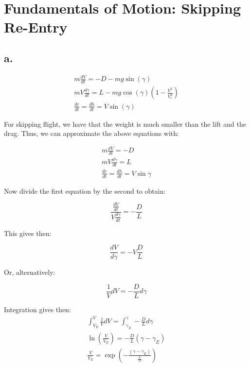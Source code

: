 \section{ Fundamentals of Motion: Skipping Re-Entry }\label{sec:q4}    
\subsection*{a.}
\begin{equation}
    \begin{split}
        m \frac{dV}{dt} = -D - mg\sin{(\gamma)} \\
        m V \frac{d \gamma}{dt} = L - mg \cos{(\gamma)}(1-\frac{V^2}{V_c^2}) \\
        \frac{dr}{dt} = \frac{dh}{dt} = V\sin{(\gamma)}
    \end{split}
\end{equation}

For skipping flight, we have that the weight is much smaller than the lift and the drag. Thus, we can approximate the above equations with:

\begin{equation}
    \begin{split}
        m \frac{dV}{dt} = -D  \\
        m V \frac{d \gamma}{dt} = L  \\
        \frac{dr}{dt} = \frac{dh}{dt} = V\sin{\gamma}
    \end{split}
\end{equation}

Now divide the first equation by the second to obtain:

\begin{equation}
    \frac{\frac{dV}{dt}}{V \frac{d \gamma }{dt}} = -\frac{D}{L}
\end{equation}

This gives then:

\begin{equation}
    \frac{dV}{d \gamma}  = - V \frac{D}{L}
\end{equation}

Or, alternatively:

\begin{equation}
    \frac{1}{V} dV = - \frac{D}{L} d\gamma
\end{equation}

Integration gives then:
\begin{equation}
    \begin{split}
        \int_{V_E}^V \frac{1}{V} dV = \int_{\gamma_E}^{\gamma} - \frac{D}{L} d\gamma \\
        \ln{(\frac{V}{V_E})} =  - \frac{D}{L}(\gamma - \gamma_E)  \\
        \frac{V}{V_E} =  \exp{(- \frac{(\gamma - \gamma_E)}{\frac{L}{D}})}  \\
    \end{split}
\end{equation}

